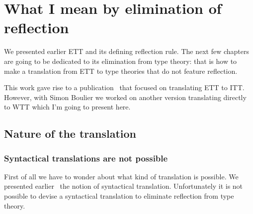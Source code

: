 \chapter{What I mean by elimination of reflection}

We presented earlier \acrshort{ETT} and its defining reflection rule.
%
%
The next few chapters are going to be dedicated to its elimination from type
theory: that is how to make a translation from \acrshort{ETT} to type theories
that do not feature reflection.

This work gave rise to a publication~ that
focused on translating \acrshort{ETT} to \acrshort{ITT}.
However, with Simon Boulier we worked on another version translating directly to
\acrshort{WTT} which I'm going to present here.

\section{Nature of the translation}

\subsection{Syntactical translations are not possible}

First of all we have to wonder about what kind of translation is possible.
We presented earlier~\misref{} the notion of syntactical translation.
Unfortunately it is not possible to devise a syntactical translation to
eliminate reflection from type theory.

